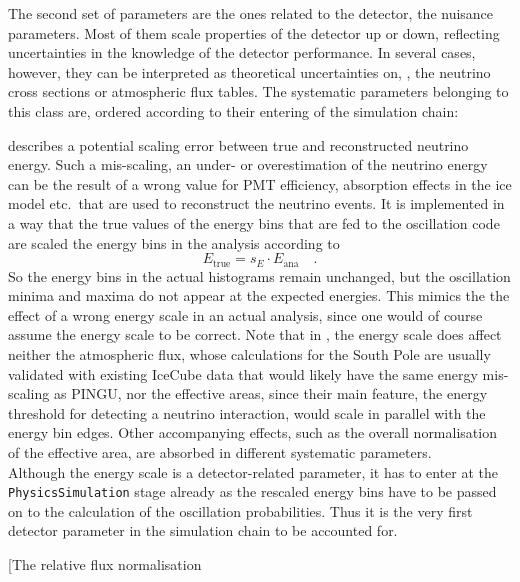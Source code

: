 The second set of parameters are the ones related to the detector, \ie the
nuisance parameters. Most of them scale properties of the detector up or down, 
reflecting uncertainties in the knowledge of the detector performance. In 
several cases, however, they can be interpreted as theoretical uncertainties 
on, \eg, the neutrino cross sections or atmospheric flux tables. The systematic 
parameters belonging to this class are, ordered according to their entering of 
the simulation chain:

\begin{description}
 \item[The energy scale $\mathbf{s_E}$] describes a potential scaling error
  between true and reconstructed neutrino energy. Such a mis-scaling, \ie
  an under- or overestimation of the neutrino energy can be the result of a
  wrong value for \eg PMT efficiency, absorption effects in the ice model etc.\ 
  that are used to reconstruct the neutrino events.
  It is implemented in a way that the true values of the energy bins that are 
  fed to the oscillation code are scaled \wrt the energy bins in the analysis 
  according to
  \begin{equation}
   E_\mathrm{true} = s_E\cdot E_\mathrm{ana}\quad.
  \end{equation}
  So the energy bins in the actual histograms remain unchanged, but the 
  oscillation minima and maxima do not appear at the expected energies. This 
  mimics the the effect of a wrong energy scale in an actual analysis, since 
  one would of course assume the energy scale to be correct. Note that in 
  \papa, the energy scale does affect neither the atmospheric flux, whose 
  calculations for the South Pole are usually validated with existing IceCube 
  data that would likely have the same energy mis-scaling as PINGU, nor the 
  effective areas, since their main feature, the energy threshold for 
  detecting a neutrino interaction, would scale in parallel with the energy bin 
  edges. Other accompanying effects, such as the overall normalisation of the 
  effective area, are absorbed in different systematic parameters. \\
  Although the energy scale is a detector-related parameter, it has to enter at 
  the \texttt{PhysicsSim\-ul\-ation} stage already as the rescaled energy bins 
  have to be passed on to the calculation of the oscillation probabilities. 
  Thus it is the very first detector parameter in the simulation chain to be 
  accounted for.
 \item[The relative flux normalisation 

\end{description}
